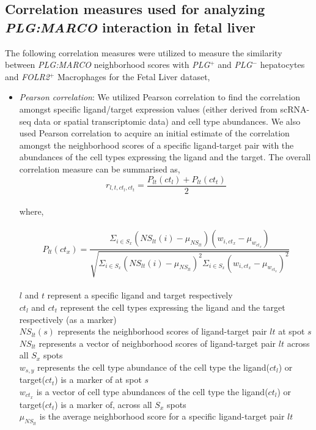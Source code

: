 \subsection*{Correlation measures used for analyzing \textit{PLG:MARCO} interaction in fetal liver}

The following correlation measures were utilized to measure the similarity between \textit{PLG:MARCO} neighborhood scores with \textit{PLG}$^{+}$ and \textit{PLG}$^{-}$ hepatocytes and \textit{FOLR2}$^{+}$ Macrophages for the Fetal Liver dataset,
\begin{itemize}
    \item \emph{Pearson correlation}: We utilized Pearson correlation to find the correlation amongst specific ligand/target expression values (either derived from scRNA-seq data or spatial transcriptomic data) and cell type abundances. We also used Pearson correlation to acquire an initial estimate of the correlation amongst the neighborhood scores of a specific ligand-target pair with the abundances of the cell types expressing the ligand and the target. The overall correlation measure can be summarised as,\\
    $$r_{{l,t},{ct_l,ct_t}} = \frac{P_{lt}(ct_l) + P_{lt}(ct_t)}{2}$$\\
    where,\\
    \\
    $$P_{lt}(ct_x) = \frac{\Sigma_{i \in S_x} (NS_{lt}(i) - \mu_{NS_{lt}})(w_{i,ct_x} - \mu_{w_{ct_x}})}{\sqrt{\Sigma_{i \in S_x} (NS_{lt}(i) - \mu_{NS_{lt}})^2 \Sigma_{i \in S_x} (w_{i,ct_x} - \mu_{w_{ct_x}})^2}}$$
    \\
    $l$ and $t$ represent a specific ligand and target respectively\\
    $ct_l$ and $ct_t$ represent the cell types expressing the ligand and the target respectively (as a marker) \\
    $NS_{lt}(s)$ represents the neighborhood scores of ligand-target pair $lt$ at spot $s$\\ 
    $NS_{lt}$ represents a vector of neighborhood scores of ligand-target pair $lt$ across all $S_x$ spots\\
    $w_{s,y}$ represents the cell type abundance of the cell type the ligand($ct_l$) or target($ct_t$) is a marker of at spot $s$\\ 
    $w_{ct_x}$ is a vector of cell type abundances of the cell type the ligand($ct_l$) or target($ct_t$) is a marker of, across all $S_x$ spots\\
    $\mu_{NS_{lt}}$ is the average neighborhood score for a specific ligand-target pair $lt$\\

\end{itemize}
